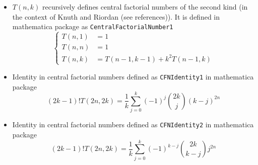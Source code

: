 \begin{itemize}
    \item $T(n,k)$ recursively defines central factorial numbers of the second kind
    (in the context of Knuth and Riordan (see references)).
    It is defined in mathematica package as \texttt{CentralFactorialNumber1}
    \begin{equation*}
        \begin{cases}
            T(n,1) &= 1 \\
            T(n,n) &= 1 \\
            T(n,k) &= T(n-1, k-1) + k^2 T(n-1, k)
        \end{cases}
    \end{equation*}
    \item Identity in central factorial numbers defined as \texttt{CFNIdentity1} in mathematica package
    \begin{equation*}
    (2k-1)! T(2n,2k) = \frac{1}{k} \sum_{j=0}^{k} (-1)^j \binom{2k}{j} (k-j)^{2n}
    \end{equation*}
    \item Identity in central factorial numbers defined as \texttt{CFNIdentity2} in mathematica package
    \begin{equation*}
    (2k-1)! T(2n,2k) = \frac{1}{k} \sum_{j=0}^{k} (-1)^{k-j} \binom{2k}{k-j} j^{2n}
    \end{equation*}
\end{itemize}